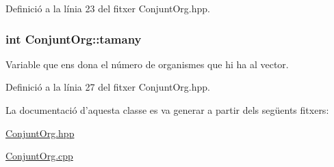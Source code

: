 Definició a la línia 23 del fitxer Conjunt\-Org.\-hpp.

\hypertarget{class_conjunt_org_a468e7686498561628ad731ea196df8b5}{
\subsubsection[{tamany}]{\setlength{\rightskip}{0pt plus 5cm}int Conjunt\-Org\-::tamany\hspace{0.3cm}{\ttfamily [private]}}}\label{class_conjunt_org_a468e7686498561628ad731ea196df8b5}


Variable que ens dona el número de organismes que hi ha al vector. 



Definició a la línia 27 del fitxer Conjunt\-Org.\-hpp.



La documentació d'aquesta classe es va generar a partir dels següents fitxers\-:\begin{DoxyCompactItemize}
\item 
\hyperlink{_conjunt_org_8hpp}{Conjunt\-Org.\-hpp}\item 
\hyperlink{_conjunt_org_8cpp}{Conjunt\-Org.\-cpp}\end{DoxyCompactItemize}
